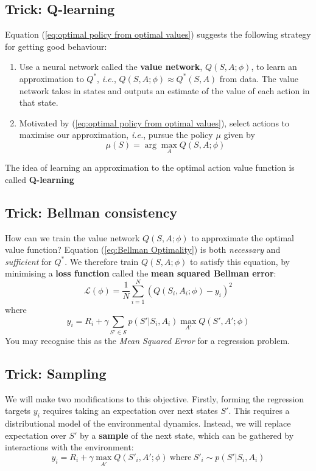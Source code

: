 \documentclass[]{article}
\newcommand{\ie}{\emph{i.e.}}
\begin{document}
\subsection*{Trick: Q-learning}
Equation (\ref{eq:optimal policy from optimal values}) suggests the following strategy for getting good behaviour:
\begin{enumerate}
	\item Use a neural network called the \textbf{value network}, $Q(S,A;\phi)$,  to learn an approximation to $Q^*$, \ie, $Q(S,A;\phi) \approx Q^*(S,A)$ from data. The value network takes in states and outputs an estimate of the value of each action in that state. 
	\item Motivated by (\ref{eq:optimal policy from optimal values}), select actions to maximise our approximation, \ie, pursue the policy $\mu$ given by 
	\begin{equation}\label{eq:policy from approximate optimal values}
		\mu(S) = \arg\max_A Q(S,A;\phi)
	\end{equation}
\end{enumerate}
The idea of learning an approximation to the optimal action value function is called \textbf{Q-learning}

\subsection*{Trick: Bellman consistency}
How can we train the value network $Q(S,A;\phi)$ to approximate the optimal value function? Equation (\ref{eq:Bellman Optimality}) is both \emph{necessary} and \emph{sufficient} for $Q^*$. We therefore train $Q(S,A;\phi)$ to satisfy this equation, by minimising a \textbf{loss function} called the \textbf{mean squared Bellman error}:
\begin{equation}\label{eq:loss function}
	\mathcal{L}(\phi) = \frac{1}{N} \sum_{i=1}^N \left( Q(S_i,A_i;\phi) - y_i \right)^2 
\end{equation}
where 
\begin{equation}
	y_i = R_i + \gamma \sum_{S'\in \mathcal{S}} p(S'|S_i,A_i) \max_{A'} Q(S',A';\phi)
\end{equation}
You may recognise this as the \emph{Mean Squared Error} for a regression problem. 

\subsection*{Trick: Sampling}
We will make two modifications to this objective. Firstly, forming the regression targets $y_i$ requires taking an expectation over next states $S'$. This requires a distributional model of the environmental dynamics. Instead, we will replace expectation over $S'$ by a \textbf{sample} of the next state, which can be gathered by interactions with the environment:
\begin{equation}
	y_i = R_i + \gamma \max_{A'} Q(S'_i,A';\phi)~\text{where}~S'_i \sim p(S'|S_i,A_i)
\end{equation}
\end{document}
